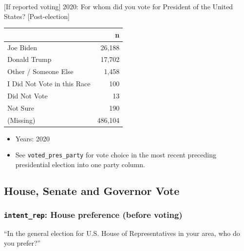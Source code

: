 \documentclass[10pt,article,oneside]{memoir}
\theoremstyle{definition}
\begin{document}
{[}If reported voting{]} 2020: For whom did you vote for President of
the United States? {[}Post-election{]}

\begin{table}[H]
\centering
\begin{tabular}{lr}
\toprule
 & n\\
\midrule
Joe Biden & 26,188\\
Donald Trump & 17,702\\
Other / Someone Else & 1,458\\
I Did Not Vote in this Race & 100\\
Did Not Vote & 13\\
Not Sure & 190\\
(Missing) & 486,104\\
\bottomrule
\end{tabular}
\end{table}

\begin{itemize}
\tightlist
\item
  Years: 2020
\item
  See \texttt{voted\_pres\_party} for vote choice in the most recent
  preceding presidential election into one party column.
\end{itemize}

\hypertarget{house-senate-and-governor-vote}{%
\subsection{House, Senate and Governor
Vote}\label{house-senate-and-governor-vote}}

\hypertarget{intent_rep-house-preference-before-voting}{%
\subsubsection{\texorpdfstring{\texttt{intent\_rep}: House preference
(before
voting)}{intent\_rep: House preference (before voting)}}\label{intent_rep-house-preference-before-voting}}

``In the general election for U.S. House of Representatives in your
area, who do you prefer?''
\end{document}
